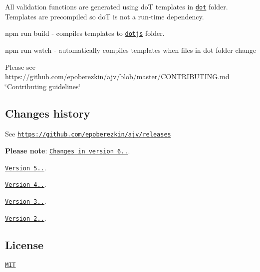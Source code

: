 All validation functions are generated using doT templates in \href{https://github.com/epoberezkin/ajv/tree/master/lib/dot}{\tt dot} folder. Templates are precompiled so doT is not a run-\/time dependency.

{\ttfamily npm run build} -\/ compiles templates to \href{https://github.com/epoberezkin/ajv/tree/master/lib/dotjs}{\tt dotjs} folder.

{\ttfamily npm run watch} -\/ automatically compiles templates when files in dot folder change

Please see https\+://github.com/epoberezkin/ajv/blob/master/\+C\+O\+N\+T\+R\+I\+B\+U\+T\+I\+N\+G.\+md \char`\"{}\+Contributing guidelines\char`\"{}

\subsection*{Changes history}

See \href{https://github.com/epoberezkin/ajv/releases}{\tt https\+://github.\+com/epoberezkin/ajv/releases}

{\bfseries Please note}\+: \href{https://github.com/epoberezkin/ajv/releases/tag/v6.0.0}{\tt Changes in version 6..}.

\href{https://github.com/epoberezkin/ajv/releases/tag/5.0.0}{\tt Version 5..}.

\href{https://github.com/epoberezkin/ajv/releases/tag/4.0.0}{\tt Version 4..}.

\href{https://github.com/epoberezkin/ajv/releases/tag/3.0.0}{\tt Version 3..}.

\href{https://github.com/epoberezkin/ajv/releases/tag/2.0.0}{\tt Version 2..}.

\subsection*{License}

\href{https://github.com/epoberezkin/ajv/blob/master/LICENSE}{\tt M\+IT} 